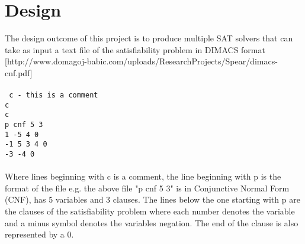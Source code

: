 \documentclass[12pt,a4paper]{article}
\begin{document}




\section{Design}
The design outcome of this project is to produce multiple SAT solvers that can take as input a text file of the satisfiability problem in DIMACS format  \cite{dimacsFormat}[http://www.domagoj-babic.com/uploads/ResearchProjects/Spear/dimacs-cnf.pdf] \\\\
\texttt{
c - this is a comment\\
c \\
c \\
p cnf 5 3\\
1 -5 4 0\\
-1 5 3 4 0\\
-3 -4 0\\
}\\
Where lines beginning with c is a comment, the line beginning with p is the format of the file e.g. the above file "p cnf 5 3" is in Conjunctive Normal Form (CNF), has 5 variables and 3 clauses. The lines below the one starting with p are the clauses of the satisfiability problem where each number denotes the variable and a minus symbol denotes the variables negation. The end of the clause is also represented by a 0.\\\\
\end{document}
